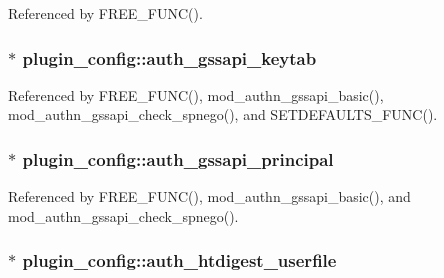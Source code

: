 Referenced by F\-R\-E\-E\-\_\-\-F\-U\-N\-C().

\hypertarget{structplugin__config_a8eccf296fad2aa78e270ad22815623d2}{
\subsubsection[{auth\-\_\-gssapi\-\_\-keytab}]{$\ast$ plugin\-\_\-config\-::auth\-\_\-gssapi\-\_\-keytab}}\label{structplugin__config_a8eccf296fad2aa78e270ad22815623d2}


Referenced by F\-R\-E\-E\-\_\-\-F\-U\-N\-C(), mod\-\_\-authn\-\_\-gssapi\-\_\-basic(), mod\-\_\-authn\-\_\-gssapi\-\_\-check\-\_\-spnego(), and S\-E\-T\-D\-E\-F\-A\-U\-L\-T\-S\-\_\-\-F\-U\-N\-C().

\hypertarget{structplugin__config_aadd7e5a63fa100286364a492dee7db89}{
\subsubsection[{auth\-\_\-gssapi\-\_\-principal}]{$\ast$ plugin\-\_\-config\-::auth\-\_\-gssapi\-\_\-principal}}\label{structplugin__config_aadd7e5a63fa100286364a492dee7db89}


Referenced by F\-R\-E\-E\-\_\-\-F\-U\-N\-C(), mod\-\_\-authn\-\_\-gssapi\-\_\-basic(), and mod\-\_\-authn\-\_\-gssapi\-\_\-check\-\_\-spnego().

\hypertarget{structplugin__config_a8f77e857c7b525ce42e3a87b047eef5a}{
\subsubsection[{auth\-\_\-htdigest\-\_\-userfile}]{$\ast$ plugin\-\_\-config\-::auth\-\_\-htdigest\-\_\-userfile}}\label{structplugin__config_a8f77e857c7b525ce42e3a87b047eef5a}


